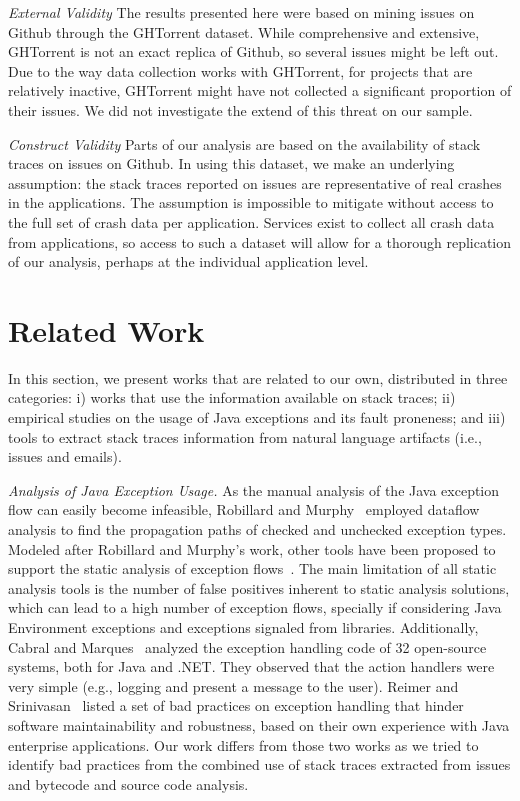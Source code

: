 \documentclass[conference]{IEEEtran}
\begin{document}
\noindent\emph{External Validity} The results presented here were based on mining
issues on Github through the GHTorrent dataset. While comprehensive and
extensive, GHTorrent is not an exact replica of Github, so several issues might
be left out. Due to the way data collection works with GHTorrent, for projects
that are relatively inactive, GHTorrent might have not collected a significant
proportion of their issues. We did not investigate the extend of this threat on
our sample.

\noindent\emph{Construct Validity} Parts of our analysis are based on the availability of stack traces on issues on
Github. In using this dataset, we make an underlying assumption: the
stack traces reported on issues are representative of real crashes in
the applications. The assumption is impossible to mitigate without access to
the full set of crash data per application. Services exist to collect all
crash data from applications, so access to such a dataset will allow for
a thorough replication of our analysis, perhaps at the individual application
level.

\section{Related Work}

In this section, we present works that are related to our own, distributed in
three categories: i) works that use the information available on stack traces;
ii) empirical studies on the usage of Java exceptions and its fault proneness;
and iii) tools to extract stack traces information from natural language artifacts
(i.e., issues and emails).

\textit{Analysis of Java Exception Usage.} As the manual analysis of the Java
exception flow can easily become infeasible, Robillard and Murphy~\cite{Robil00}
employed dataflow analysis to find the propagation paths of checked and
unchecked exception types. Modeled after Robillard and Murphy's work, other
tools have been proposed to support the static analysis of exception
flows~\cite{coelho2008assessing}. The main limitation of all
static analysis tools is the number of false positives inherent to static analysis
solutions, which can lead to a high number of exception flows, specially if
considering Java Environment exceptions and exceptions signaled from libraries.
Additionally, Cabral and Marques~\cite{cabral2007exception} analyzed the
exception handling code of 32 open-source systems, both for Java and .NET. They
observed that the action handlers were very simple (e.g., logging and present a
message to the user). Reimer and Srinivasan~\cite{reimer2003analyzing} listed a
set of bad practices on exception handling that hinder software maintainability
and robustness, based on their own experience with Java enterprise applications.
Our work differs from those two works as we tried to identify bad practices from
the combined use of stack traces extracted from issues and bytecode and source
code analysis. 
\end{document}
